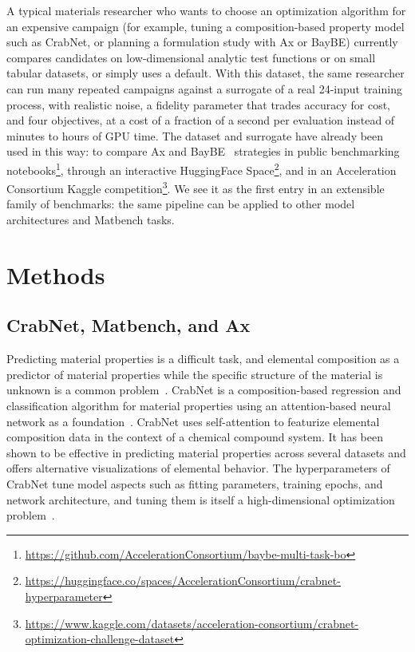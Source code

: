 \documentclass[pdflatex,sn-mathphys-num]{sn-jnl}
\begin{document}
A typical materials researcher who wants to choose an optimization algorithm for an expensive campaign (for example, tuning a composition-based property model such as CrabNet, or planning a formulation study with Ax or BayBE) currently compares candidates on low-dimensional analytic test functions or on small tabular datasets, or simply uses a default. With this dataset, the same researcher can run many repeated campaigns against a surrogate of a real 24-input training process, with realistic noise, a fidelity parameter that trades accuracy for cost, and four objectives, at a cost of a fraction of a second per evaluation instead of minutes to hours of GPU time. The dataset and surrogate have already been used in this way: to compare Ax and BayBE~\cite{Fitzner2025_BayBE} strategies in public benchmarking notebooks\footnote{\url{https://github.com/AccelerationConsortium/baybe-multi-task-bo}}, through an interactive HuggingFace Space\footnote{\url{https://huggingface.co/spaces/AccelerationConsortium/crabnet-hyperparameter}}, and in an Acceleration Consortium Kaggle competition\footnote{\url{https://www.kaggle.com/datasets/acceleration-consortium/crabnet-optimization-challenge-dataset}}. We see it as the first entry in an extensible family of benchmarks: the same pipeline can be applied to other model architectures and Matbench tasks.

\section{Methods}\label{sec:methods}

\subsection{CrabNet, Matbench, and Ax}\label{sec:methods-tools}

Predicting material properties is a difficult task, and elemental composition as a predictor of material properties while the specific structure of the material is unknown is a common problem~\cite{Jha2018_ElemNet,Goodall2020_Roost,Wang2021_CrabNet}. CrabNet is a composition-based regression and classification algorithm for material properties using an attention-based neural network as a foundation~\cite{Wang2021_CrabNet}. CrabNet uses self-attention to featurize elemental composition data in the context of a chemical compound system. It has been shown to be effective in predicting material properties across several datasets and offers alternative visualizations of elemental behavior. The hyperparameters of CrabNet tune model aspects such as fitting parameters, training epochs, and network architecture, and tuning them is itself a high-dimensional optimization problem~\cite{Existing05_Baird2022_CrabNet}.
\end{document}
